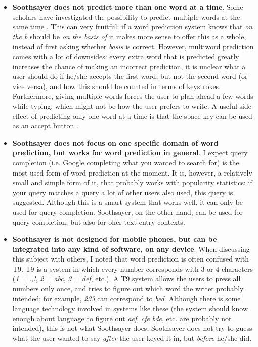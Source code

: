 \documentclass[11pt]{article}
\begin{document}
\begin{itemize}
\item \textbf{Soothsayer does not predict more than one word at a time}. Some scholars have investigated the possibility to predict multiple words at the same time \cite{Lesher+99,greenberg+95}. This can very fruitful: if a word prediction system knows that \emph{on the b} should be \emph{on the basis of} it makes more sense to offer this as a whole, instead of first asking whether \emph{basis} is correct. However, multiword prediction comes with a lot of downsides: every extra word that is predicted greatly increases the chance of making an incorrect prediction, it is unclear what a user should do if he/she accepts the first word, but not the second word (or vice versa), and how this should be counted in terms of keystrokes. Furthermore, giving multiple words forces the user to plan ahead a few words while typing, which might not be how the user prefers to write. A useful side effect of predicting only one word at a time is that the space key can be used as an accept button \cite{Garay-Vitoria+06}.

\item \textbf{Soothsayer does not focus on one specific domain of word prediction, but works for word prediction in general}. I expect query completion (i.e. Google completing what you wanted to search for) is the most-used form of word prediction at the moment. It is, however, a relatively small and simple form of it, that probably works with popularity statistics: if your query matches a query a lot of other users also used, this query is suggested. Although this is a smart system that works well, it can only be used for query completion. Soothsayer, on the other hand, can be used for query completion, but also for oher text entry contexts.

\item \textbf{Soothsayer is not designed for mobile phones, but can be integrated into any kind of software, on any device}. When discussing this subject with others, I noted that word prediction is often confused with T9. T9 is a system in which every number corresponds with 3 or 4 characters (\emph{1} = \emph{.,!}, \emph{2} = \emph{abc}, \emph{3} = \emph{def}, etc.). A T9 system allows the users to press all numbers only once, and tries to figure out which word the writer probably intended; for example, \emph{233} can correspond to \emph{bed}. Although there is some language technology involved in systems like these (the system should know enough about language to figure out \emph{aef}, \emph{cfe} \emph{bde}, etc. are probably not intended), this is not what Soothsayer does; Soothsayer does not try to guess what the user wanted to say \emph{after} the user keyed it in, but \emph{before} he/she did. 


\end{itemize}
\end{document}
